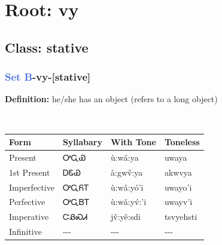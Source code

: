 \needspace{4in}
\section*{Root: vy}
\nopagebreak
{}
\needspace{3in}
\subsection*{Class: stative}
\nopagebreak
\needspace{2in}
\subsubsection*{\textcolor{RoyalBlue}{Set B}{-}\textbf{vy}{-}[stative]}
\nopagebreak
\textbf{Definition: } he/she has an object (refers to a long object)
\\[0.5em]
\begin{tabularx}{\textwidth}{l X X X}%
\toprule%
\textbf{Form}&\textbf{Syllabary}&\textbf{With Tone}&\textbf{Toneless}\\%
\midrule%
Present&ᎤᏩᏯ&ù:wǎ:ya&uwaya\\%
1st Present&ᎠᏋᏯ&à:gwv̌:ya&akwvya\\%
Imperfective&ᎤᏩᏲᎢ&ù:wǎ:yó’i&uwayo'i\\%
Perfective&ᎤᏩᏴᎢ&ù:wǎ:yv́:’i&uwayv'i\\%
Imperative&ᏨᏰᏍᏗ&jv̌:yê:sdi&tsvyehsti\\%
Infinitive&{-}{-}{-}&{-}{-}{-}&{-}{-}{-}\\%
\bottomrule%
\end{tabularx}
\\[1em]